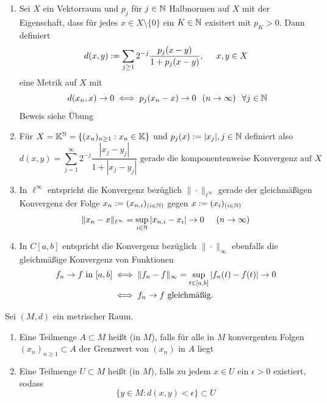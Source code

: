 \begin{beispiel}  \label{bsp:1-4.3}
	\begin{enumerate}[label=\alph*\upshape)]	
		\item Sei $X$ ein Vektorraum und $p_{j}$ für $j \in \mathbb{N}$ Halbnormen auf $X$ mit der Eigenschaft, dass für jedes $x \in X \setminus \{ 0 \}$ ein $K \in \mathbb{N}$ exisitert mit $p_{K} > 0$. Dann definiert
			\[ d(x, y) := \sum_{j \geq 1} 2^{-j} \frac{p_{j}(x - y)}{1 + p_{j}(x -y)}, \hspace{0.5cm} x, y \in X \]
			eine Metrik auf $X$ mit
			\[ d(x_{n}, x) \rightarrow 0 \gdw p_{j}(x_{n} - x) \rightarrow 0 \hspace{0.25cm} (n \rightarrow  \infty) \hspace{0.25cm} \forall j \in \MdN \]
			Beweis siehe Übung
		\item Für $X = \mathbb{K}^{\mathbb{N}} = \{ (x_{n})_{n \geq 1}: x_{n} \in \mathbb{K} \}$ und $p_{j}(x) := |x_{j}|, j \in \mathbb{N}$ definiert also
			\[ d(x, y) = \sum_{j = 1}^{\infty} 2^{-j} \frac{|x_{j} - y_{j}|}{1 + |x_{j} - y_{j}|} \text{ gerade die komponentenweise Konvergenz auf } X \]
		\item In $\ell^{\infty}$ entspricht die Konvergenz bezüglich $\| \cdot \|_{\ell^{\infty}}$ gerade der gleichmä{\ss}igen Konvergenz der Folge $x_{n} := (x_{n, i})_{(i \in \mathbb{N})}$ gegen $x := (x_{i})_{(i \in \mathbb{N})}$
			\[ \| x_{n} - x \|_{\ell^{\infty}} = \sup_{i \in \mathbb{N}} | x_{n, i} - x_{i} | \rightarrow 0 \hspace{0.5cm} (n \rightarrow \infty) \]
		\item In $C[a, b]$ entspricht die Konvergenz bezüglich $\| \cdot \|_{\infty}$ ebenfalls die gleichmä{\ss}ige Konvergenz von Funktionen
			\begin{align*}
				f_{n} \rightarrow f \text{ in } [a, b] & \iff \| f_{n} - f \|_{\infty} = \sup_{t \in [a, b]} |f_{n}(t) - f(t) | \rightarrow 0 \\
				& \iff f_{n} \rightarrow f \text{ gleichmä{\ss}ig.}
			\end{align*}
	\end{enumerate}
\end{beispiel}

\begin{definition} \label{def:1-4.4}
	Sei $(M, d)$ ein metrischer Raum.
	\begin{enumerate}[label=\alph*\upshape)]
		\item Eine Teilmenge $A \subset M$ hei{\ss}t  (in $M$), falls für alle in $M$ konvergenten Folgen $(x_{n})_{n \geq 1} \subset A$ der Grenzwert von $(x_{n})$ in $A$ liegt
		\item Eine Teilmenge $U \subset M$ hei{\ss}t  (in $M$), falls zu jedem $x \in U$ ein $\epsilon > 0$ existiert, sodass
			\[ \{ y \in M: d(x, y) < \epsilon \} \subset U \]
	\end{enumerate}
\end{definition}

